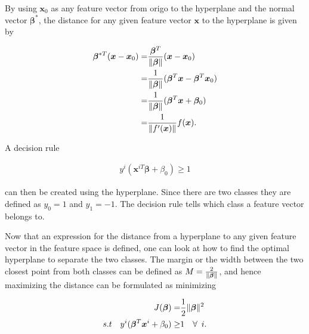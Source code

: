             
            
            By using $\bm x_0$ as any feature vector from origo to the hyperplane and the normal vector $\bm \beta^*$, the distance for any given feature vector $\bm x$ to the hyperplane is given by
            
            \begin{align}
                \bm \beta^{*T}(\bm x - \bm x_0) = & \frac{\bm \beta^T}{\lVert\bm \beta\rVert} (\bm x - \bm x_0) \nonumber \\
                = & \frac{1}{\lVert\bm \beta\rVert}(\bm \beta^T\bm x- \bm \beta^T\bm x_0) \nonumber \\
                = & \frac{1}{\lVert\bm \beta\rVert}(\bm \beta^T\bm x + \bm \beta_0) \nonumber \\
                = & \frac{1}{\lVert f'(\bm x)\rVert}f(\bm x).
                \label{svm:dist}
            \end{align}
            
            
            
            A decision rule 
            
            \begin{align}
                y^i(\bm x^{iT} \bm \beta + \beta_0) \geq 1 
                \label{svm:decision}
            \end{align}
            
            can then be created using the hyperplane. Since there are two classes they are defined as $y_0 = 1$ and $y_1 = -1$. The decision rule tells which class a feature vector belongs to.
            
            
            
            
            
            Now that an expression for the distance from a hyperplane to any given feature vector in the feature space is defined, one can look at how to find the optimal hyperplane to separate the two classes. The margin or the width between the two closest point from both classes can be defined as $M = \frac{2}{\lVert\bm \beta\rVert}$, and hence maximizing the distance can be formulated as minimizing 
            
            \begin{align}
                J(\bm \beta) = & \frac{1}{2}\lVert\bm \beta\rVert^2 \nonumber \\
                 s.t \quad y^i(\bm \beta^T\bm x^i + \beta_0) \geq & 1 \quad \forall \enspace i.
                \label{svm:cost}
            \end{align}
            

